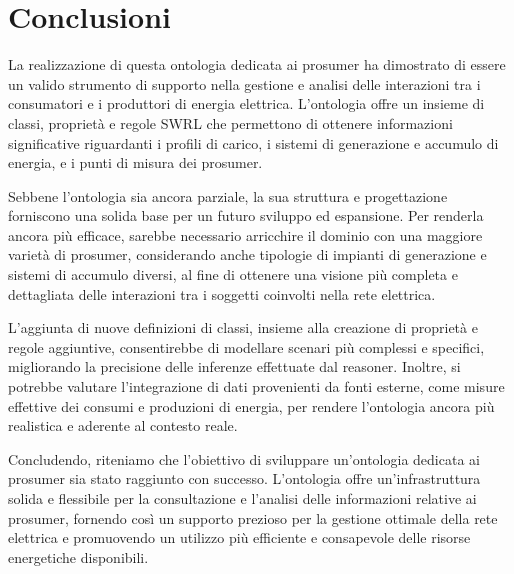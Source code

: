 \chapter{Conclusioni}

La realizzazione di questa ontologia dedicata ai prosumer ha dimostrato di essere un valido strumento di supporto nella gestione e analisi delle interazioni tra i consumatori e i produttori di energia elettrica. L'ontologia offre un insieme di classi, proprietà e regole SWRL che permettono di ottenere informazioni significative riguardanti i profili di carico, i sistemi di generazione e accumulo di energia, e i punti di misura dei prosumer.

Sebbene l'ontologia sia ancora parziale, la sua struttura e progettazione forniscono una solida base per un futuro sviluppo ed espansione. Per renderla ancora più efficace, sarebbe necessario arricchire il dominio con una maggiore varietà di prosumer, considerando anche tipologie di impianti di generazione e sistemi di accumulo diversi, al fine di ottenere una visione più completa e dettagliata delle interazioni tra i soggetti coinvolti nella rete elettrica.

L'aggiunta di nuove definizioni di classi, insieme alla creazione di proprietà e regole aggiuntive, consentirebbe di modellare scenari più complessi e specifici, migliorando la precisione delle inferenze effettuate dal reasoner. Inoltre, si potrebbe valutare l'integrazione di dati provenienti da fonti esterne, come misure effettive dei consumi e produzioni di energia, per rendere l'ontologia ancora più realistica e aderente al contesto reale.

Concludendo, riteniamo che l'obiettivo di sviluppare un'ontologia dedicata ai prosumer sia stato raggiunto con successo. L'ontologia offre un'infrastruttura solida e flessibile per la consultazione e l'analisi delle informazioni relative ai prosumer, fornendo così un supporto prezioso per la gestione ottimale della rete elettrica e promuovendo un utilizzo più efficiente e consapevole delle risorse energetiche disponibili.